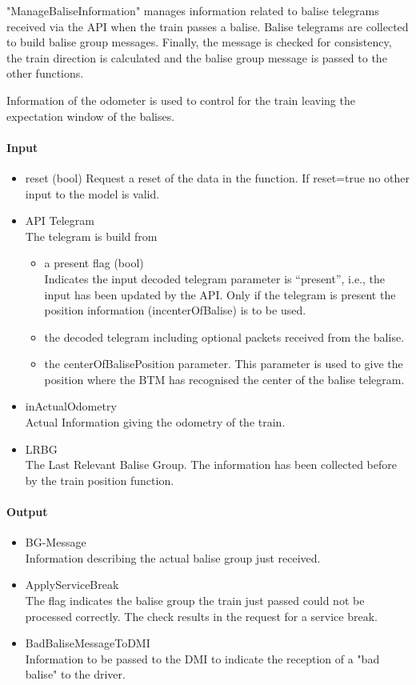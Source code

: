 \documentclass{template/openetcs_report}
\begin{document}
"ManageBaliseInformation" manages information related to balise telegrams received via the API when the train passes a balise. Balise telegrams are collected to build balise group messages. Finally, the message is checked for consistency, the train direction is calculated and the balise group message  is passed to the other functions.

Information of the odometer is used to control for the train leaving the expectation window of the balises.

\paragraph{Input}
\begin{itemize}
\item reset	(bool)	
Request a reset of the data in the function.
If reset=true no other input to the model is valid.
\item API Telegram \\
The telegram is build from 

\begin{itemize}
\item a present flag (bool)\\
Indicates the input decoded telegram parameter is “present”, i.e., the input has been updated by the API.
Only if the telegram is present the position information (incenterOfBalise) is to be used.\\
\item the decoded telegram including optional packets received from the balise.
\item the centerOfBalisePosition parameter. This parameter is used to give the position where the BTM has recognised the center of the balise telegram.
\end{itemize}

\item inActualOdometry\\
Actual Information giving the odometry of the train. 
\item LRBG\\
The Last Relevant Balise Group. The information has been collected before by the train position function.\\
\end{itemize}

\paragraph{Output}
\begin{itemize}
\item BG-Message\\
Information describing the actual balise group just received.
\item ApplyServiceBreak\\
The flag indicates the balise group the train just passed could not be processed correctly. The check results in the request for a service break.\\
\item BadBaliseMessageToDMI\\
Information to be passed to the DMI to indicate the reception of a "bad balise" to the driver.
\end{itemize}
\end{document}
